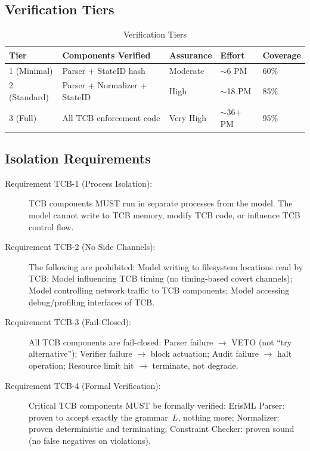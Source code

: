 \documentclass[11pt,letterpaper]{article}
\theoremstyle{definition}
\theoremstyle{remark}
\begin{document}
\subsection{Verification Tiers}

\begin{table}[h]
\centering
\begin{tabular}{@{}lllll@{}}
\toprule
\textbf{Tier} & \textbf{Components Verified} & \textbf{Assurance} & \textbf{Effort} & \textbf{Coverage} \\
\midrule
1 (Minimal) & Parser + StateID hash & Moderate & $\sim$6 PM & 60\% \\
2 (Standard) & Parser + Normalizer + StateID & High & $\sim$18 PM & 85\% \\
3 (Full) & All TCB enforcement code & Very High & $\sim$36+ PM & 95\% \\
\bottomrule
\end{tabular}
\caption{Verification Tiers}
\end{table}

\subsection{Isolation Requirements}

\begin{description}
\item[Requirement TCB-1 (Process Isolation):] TCB components MUST run in separate processes from the model. The model cannot write to TCB memory, modify TCB code, or influence TCB control flow.

\item[Requirement TCB-2 (No Side Channels):] The following are prohibited: Model writing to filesystem locations read by TCB; Model influencing TCB timing (no timing-based covert channels); Model controlling network traffic to TCB components; Model accessing debug/profiling interfaces of TCB.

\item[Requirement TCB-3 (Fail-Closed):] All TCB components are fail-closed: Parser failure $\to$ VETO (not ``try alternative''); Verifier failure $\to$ block actuation; Audit failure $\to$ halt operation; Resource limit hit $\to$ terminate, not degrade.

\item[Requirement TCB-4 (Formal Verification):] Critical TCB components MUST be formally verified: ErisML Parser: proven to accept exactly the grammar~$L$, nothing more; Normalizer: proven deterministic and terminating; Constraint Checker: proven sound (no false negatives on violations).
\end{description}
\end{document}
